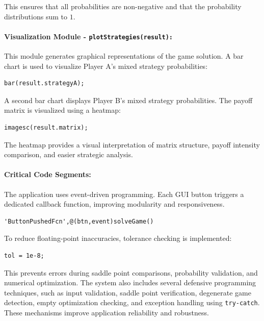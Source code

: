 \documentclass[12pt,a4paper]{article}
\begin{document}
This ensures that all probabilities are non-negative and that the probability distributions sum to \(1\).

\paragraph{Visualization Module - \texttt{plotStrategies(result):}}

This module generates graphical representations of the game solution. A bar chart is used to visualize Player A's mixed strategy probabilities:

\begin{lstlisting}[style=code]
bar(result.strategyA);
\end{lstlisting}

A second bar chart displays Player B's mixed strategy probabilities. The payoff matrix is visualized using a heatmap:

\begin{lstlisting}[style=code]
imagesc(result.matrix);
\end{lstlisting}

The heatmap provides a visual interpretation of matrix structure, payoff intensity comparison, and easier strategic analysis.

\paragraph{Critical Code Segments:}

The application uses event-driven programming. Each GUI button triggers a dedicated callback function, improving modularity and responsiveness.

\begin{lstlisting}[style=code]
'ButtonPushedFcn',@(btn,event)solveGame()
\end{lstlisting}

To reduce floating-point inaccuracies, tolerance checking is implemented:

\begin{lstlisting}[style=code]
tol = 1e-8;
\end{lstlisting}

This prevents errors during saddle point comparisons, probability validation, and numerical optimization. The system also includes several defensive programming techniques, such as input validation, saddle point verification, degenerate game detection, empty optimization checking, and exception handling using \texttt{try-catch}. These mechanisms improve application reliability and robustness.
\end{document}
